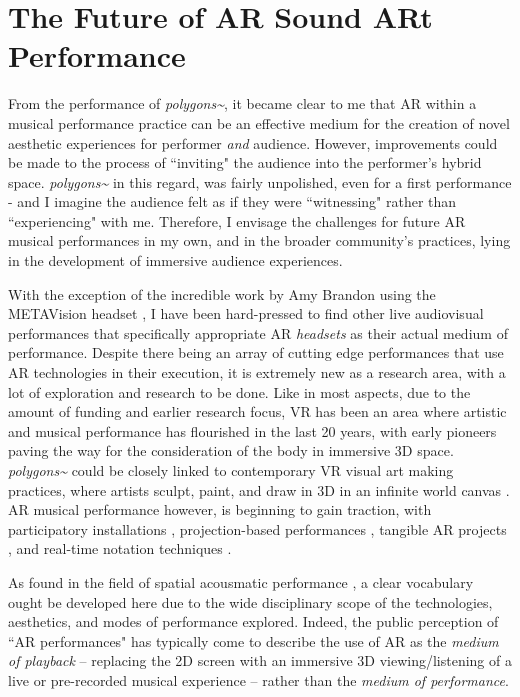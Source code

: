 \section{The Future of AR Sound ARt Performance}
From the performance of \textit{polygons\textasciitilde{}}, it became clear to me that AR within a musical performance practice can be an effective medium for the creation of novel aesthetic experiences for performer \textit{and} audience. However, improvements could be made to the process of ``inviting" the audience into the performer's hybrid space. \textit{polygons\textasciitilde{}} in this regard, was fairly unpolished, even for a first performance - and I imagine the audience felt as if they were ``witnessing" rather than ``experiencing" with me. Therefore, I envisage the challenges for future AR musical performances in my own, and in the broader community's practices, lying in the development of immersive audience experiences.

 With the exception of the incredible work by Amy Brandon using the METAVision headset \citeyearpar{brandon2018}, I have been hard-pressed to find other live audiovisual performances that specifically appropriate AR \textit{headsets} as their actual medium of performance. Despite there being an array of cutting edge performances that use AR technologies in their execution, it is extremely new as a research area, with a lot of exploration and research to be done. Like in most aspects, due to the amount of funding and earlier research focus, VR has been an area where artistic and musical performance has flourished in the last 20 years, with early pioneers \citep{davies2004} paving the way for the consideration of the body in immersive 3D space. \textit{polygons\textasciitilde{}} could be closely linked to contemporary VR visual art making practices, where artists sculpt, paint, and draw in 3D in an infinite world canvas \citep{summers2019}. AR musical performance however, is beginning to gain traction, with participatory installations \citep{chevalier2018},  projection-based performances \citep{quay2016,berthaut2016,robinson2020}, tangible AR projects \cite{zamborlin2018}, and real-time notation techniques \citep{santini2020,santini2022}. 

As found in the field of spatial acousmatic performance \citep{sharma2015}, a clear vocabulary ought be developed here due to the wide disciplinary scope of the technologies, aesthetics, and modes of performance explored. Indeed, the public perception of ``AR performances" has typically come to describe the use of AR as the \textit{medium of playback} -- replacing the 2D screen with an immersive 3D viewing/listening of a live or pre-recorded musical experience -- rather than the \textit{medium of performance}.

